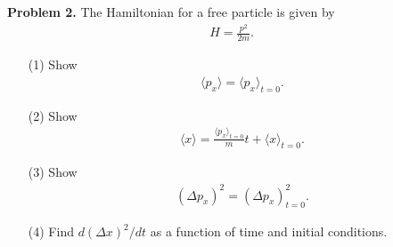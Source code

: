 \documentclass[floatfix,nofootinbib,superscriptaddress,fleqn]{revtex4-2}
\begin{document}
\vspace{0.5cm}

\noindent \textbf{Problem 2.} 
The Hamiltonian for a free particle is given by
\begin{align*}
H  = \frac{p^2}{2m}.
\end{align*}
\begin{itemize}
\item[(1)] Show 
  \begin{align*}
    \langle p_x \rangle = \langle p_x\rangle_{t=0}.
  \end{align*}
\item[(2)] Show 
  \begin{align*}
    \langle x \rangle = \frac{\langle p_x\rangle_{t=0}}{m} t + \langle
    x \rangle_{t=0}.
  \end{align*}
\item[(3)] Show 
  \begin{align*}
(\Delta p_x)^2 =  (\Delta p_x)_{t=0}^2  .
  \end{align*}
\item[(4)] Find $d(\Delta x)^2/dt$ as a function of time and initial 
  conditions. 
\end{itemize}
\end{document}

